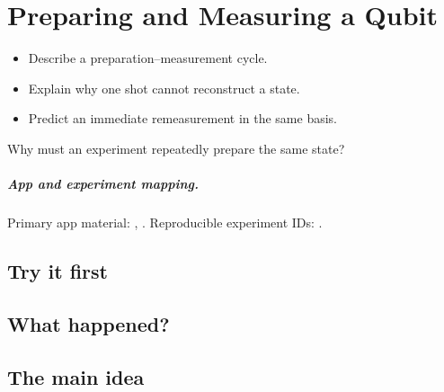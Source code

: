 \chapter{Preparing and Measuring a Qubit}
\label{chap:preparing-and-measuring-a-qubit}

\begin{learningobjectives}
\begin{itemize}
  \item Describe a preparation--measurement cycle.
  \item Explain why one shot cannot reconstruct a state.
  \item Predict an immediate remeasurement in the same basis.
\end{itemize}
\end{learningobjectives}

\begin{openingquestion}
Why must an experiment repeatedly prepare the same state?
\end{openingquestion}

\paragraph{App and experiment mapping.}
Primary app material: , . Reproducible experiment IDs:
.

\section{Try it first}
\begin{tryit}
\end{tryit}

\section{What happened?}

\section{The main idea}
\begin{coreidea}
\end{coreidea}

